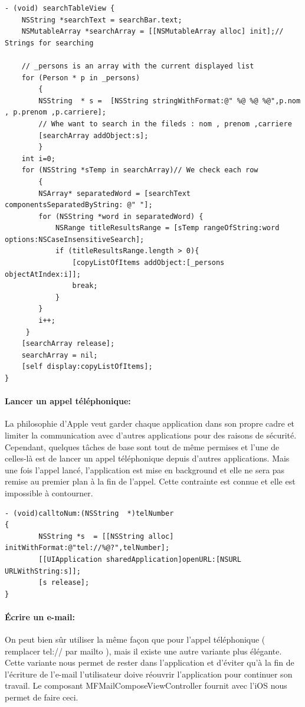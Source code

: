 \begin{lstlisting}[name=Recherche dans UITableView  , label=searchTBV]
- (void) searchTableView {
	NSString *searchText = searchBar.text;
	NSMutableArray *searchArray = [[NSMutableArray alloc] init];// Strings for searching
	
	// _persons is an array with the current displayed list 
	for (Person * p in _persons)
        {
        NSString  * s =  [NSString stringWithFormat:@" %@ %@ %@",p.nom , p.prenom ,p.carriere];
        // Whe want to search in the fileds : nom , prenom ,carriere
		[searchArray addObject:s];
        }
	int i=0;
	for (NSString *sTemp in searchArray)// We check each row
        {
        NSArray* separatedWord = [searchText componentsSeparatedByString: @" "];
        for (NSString *word in separatedWord) {
            NSRange titleResultsRange = [sTemp rangeOfString:word options:NSCaseInsensitiveSearch];
            if (titleResultsRange.length > 0){
                [copyListOfItems addObject:[_persons objectAtIndex:i]];
                break;
            }
        }
        i++;
     }
	[searchArray release];
	searchArray = nil;
	[self display:copyListOfItems];
}
\end{lstlisting}
					\paragraph{Lancer un appel téléphonique:} La philosophie d'Apple veut garder chaque application dans son propre cadre et limiter la communication avec d'autres applications pour des raisons de sécurité. Cependant, quelques tâches de base sont tout de même permises et l'une de celles-là est de lancer un appel téléphonique depuis d'autres applications. Mais une fois l'appel lancé, l'application est mise en background et elle ne sera pas remise au premier plan à la fin de l'appel. Cette contrainte est connue et elle est impossible à contourner.
			\lstset{
				style = Xcode,
				caption=Lancement d'un appel téléphonique sur l'iPhone.,
				breaklines=true,
				frame=single
				}
					
\begin{lstlisting}[name=Recherche dans UITableView  , label=searchTBV]
- (void)calltoNum:(NSString  *)telNumber
{
        NSString *s  = [[NSString alloc] initWithFormat:@"tel://%@?",telNumber];
        [[UIApplication sharedApplication]openURL:[NSURL URLWithString:s]];   
        [s release];
}
\end{lstlisting}
					
			\paragraph{Écrire un e-mail:} On peut bien sûr utiliser la même façon que pour l'appel téléphonique ( remplacer tel:// par mailto ), mais il existe une autre variante plus élégante. Cette variante nous permet de rester dans l'application et d'éviter qu'à la fin de l'écriture de l'e-mail l'utilisateur doive réouvrir l'application pour continuer son travail.  Le composant MFMailComposeViewController fournit avec l'iOS nous permet de faire ceci.
\lstset{
		style = Xcode,
		caption=Ouverture  de la fenêtre d'écriture d'e-mail,
		breaklines=true,
		frame=single
}
				

